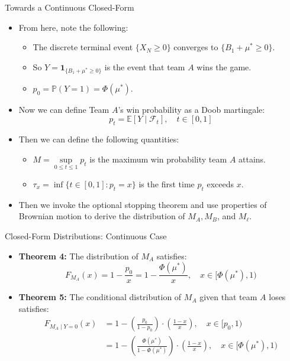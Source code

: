 \documentclass{beamer}
\renewcommand{\P}{\mathbb{P}}
\begin{document}
\begin{frame}{Towards a Continuous Closed-Form}
  \begin{itemize}
    \item From here, note the following:
    \pause
    \begin{itemize}
      \item The discrete terminal event $\{X_N \geq 0\}$ converges to $\{B_1 + \mu^* \geq 0\}$.
      \pause
      \item So $Y = \boldsymbol{1}_{\{B_1 + \mu^* \geq 0\}}$ is the event that team $A$ wins the game.
      \pause
      \item $p_0 = \P(Y = 1) = \Phi(\mu^*)$.
    \end{itemize}
    \pause
    \item Now we can define Team $A$'s win probability as a Doob martingale:
    \begin{equation*}
      p_t = \mathbb{E}[Y \mid \mathcal{F}_t], \quad t \in [0,1]
    \end{equation*}
    \pause
    \item Then we can define the following quantities:
    \pause
    \begin{itemize}
      \item $M = \underset{0 \leq t \leq 1}{\sup} p_t$ is the maximum win probability team $A$ attains.
      \pause
      \item $\tau_x = \inf\{t \in [0,1]: p_t = x\}$ is the first time $p_t$ exceeds $x$.
    \end{itemize}
    \pause
    \item Then we invoke the optional stopping theorem and use properties of Brownian motion to derive the distribution of $M_A, M_B$, and $M_\ell$.
  \end{itemize}
\end{frame}


\begin{frame}{Closed-Form Distributions: Continuous Case}
  \begin{itemize}
    \item \textbf{Theorem 4:} The distribution of $M_A$ satisfies:
    \begin{equation*}
      F_{M_A}(x) = 1 - \frac{p_0}{x} = 1 - \frac{\Phi(\mu^*)}{x}, \quad x \in [\Phi(\mu^*),1)
    \end{equation*}
    \pause
    \item \textbf{Theorem 5:} The conditional distribution of $M_A$ given that team $A$ loses satisfies:
    \begin{align*}
      F_{M_A \mid Y = 0}(x) &= 1 - \left(\frac{p_0}{1-p_0}\right) \cdot \left(\frac{1 - x}{x}\right), \quad x \in [p_0, 1) \\
      &= 1 - \left(\frac{\Phi(\mu^*)}{1-\Phi(\mu^*)}\right) \cdot \left(\frac{1 - x}{x}\right), \quad x \in [\Phi(\mu^*), 1)
    \end{align*}
  \end{itemize}
\end{frame}
\end{document}
